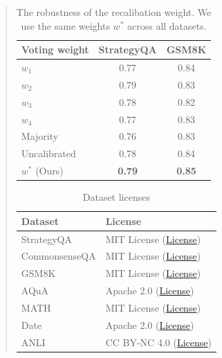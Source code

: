 \documentclass[11pt]{article}
\begin{document}
\begin{abstract}
\begin{table}[t]
\small
\centering
\begin{tabular}{lcc}
\toprule
Voting weight & StrategyQA & GSM8K \\ \midrule
$w_1$            & 0.77       & 0.84  \\
$w_2$            & 0.79       & 0.83  \\
$w_3$            & 0.78       & 0.82  \\
$w_4$            & 0.77       & 0.83  \\
Majority      & 0.76       & 0.83  \\
Uncalibrated  & 0.78       & 0.84  \\
$w^*$ (Ours)          & \textbf{0.79}       & \textbf{0.85}  \\
\bottomrule
\end{tabular}
\caption{The robustness of the recalibation weight. We use the same weights $w^*$ across all datasets.}
\label{tab:voting_weight}
\end{table}

\begin{table}[t]
\small
\centering
\begin{tabular}{ll}
\toprule
\textbf{Dataset} & \textbf{License} \\ \midrule
StrategyQA & MIT License (\href{https://github.com/eladsegal/strategyqa/blob/main/LICENSE}{License}) \\ 
CommonsenseQA & MIT License (\href{https://github.com/jonathanherzig/commonsenseqa/issues/5}{License}) \\ 
GSM8K & MIT License (\href{https://github.com/openai/grade-school-math/blob/master/LICENSE}{License}) \\ 
AQuA & Apache 2.0 (\href{https://github.com/google-deepmind/AQuA/blob/master/LICENSE}{License}) \\
MATH & MIT License (\href{https://github.com/hendrycks/math/blob/main/LICENSE}{License}) \\ 
Date & Apache 2.0 (\href{https://github.com/google/BIG-bench/blob/main/LICENSE}{License}) \\
ANLI & CC BY-NC 4.0 (\href{https://github.com/facebookresearch/anli/blob/main/LICENSE}{License}) \\
\bottomrule
\end{tabular}
\caption{Dataset licenses}
\label{tab:dataset_licenses}
\end{table}


\end{abstract}
\end{document}
